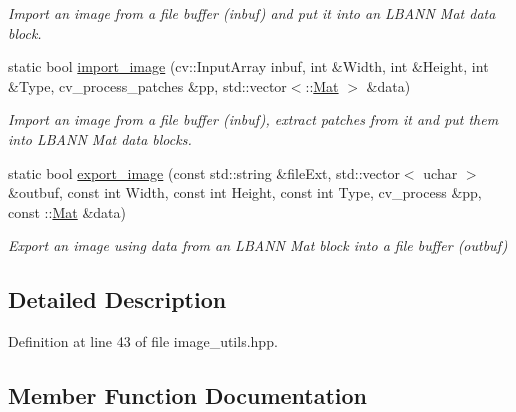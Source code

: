 \begin{DoxyCompactItemize}
\begin{DoxyCompactList}\small\item\em Import an image from a file buffer (inbuf) and put it into an L\+B\+A\+NN Mat data block. \end{DoxyCompactList}\item 
static bool \hyperlink{classlbann_1_1image__utils_af7c5409bd273f77282ecd9656e892cd3}{import\+\_\+image} (cv\+::\+Input\+Array inbuf, int \&Width, int \&Height, int \&Type, cv\+\_\+process\+\_\+patches \&pp, std\+::vector$<$\+::\hyperlink{base_8hpp_a68f11fdc31b62516cb310831bbe54d73}{Mat} $>$ \&data)
\begin{DoxyCompactList}\small\item\em Import an image from a file buffer (inbuf), extract patches from it and put them into L\+B\+A\+NN Mat data blocks. \end{DoxyCompactList}\item 
static bool \hyperlink{classlbann_1_1image__utils_a155896efaea4c03897a3a2a6c82cf7b2}{export\+\_\+image} (const std\+::string \&file\+Ext, std\+::vector$<$ uchar $>$ \&outbuf, const int Width, const int Height, const int Type, cv\+\_\+process \&pp, const \+::\hyperlink{base_8hpp_a68f11fdc31b62516cb310831bbe54d73}{Mat} \&data)
\begin{DoxyCompactList}\small\item\em Export an image using data from an L\+B\+A\+NN Mat block into a file buffer (outbuf) \end{DoxyCompactList}\end{DoxyCompactItemize}


\subsection{Detailed Description}


Definition at line 43 of file image\+\_\+utils.\+hpp.



\subsection{Member Function Documentation}
\mbox{\label{classlbann_1_1image__utils_a155896efaea4c03897a3a2a6c82cf7b2}} 
